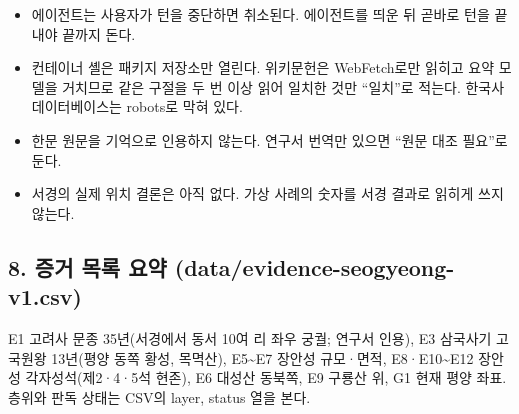 \documentclass[10pt,a4paper]{article}
\providecommand{\tightlist}{\setlength{\itemsep}{0pt}\setlength{\parskip}{0pt}}
\begin{document}
\begin{itemize}
\tightlist
\item
  에이전트는 사용자가 턴을 중단하면 취소된다. 에이전트를 띄운 뒤 곧바로 턴을 끝내야 끝까지 돈다.
\item
  컨테이너 셸은 패키지 저장소만 열린다. 위키문헌은 WebFetch로만 읽히고 요약 모델을 거치므로 같은 구절을 두 번 이상 읽어 일치한 것만 ``일치''로 적는다. 한국사데이터베이스는 robots로 막혀 있다.
\item
  한문 원문을 기억으로 인용하지 않는다. 연구서 번역만 있으면 ``원문 대조 필요''로 둔다.
\item
  서경의 실제 위치 결론은 아직 없다. 가상 사례의 숫자를 서경 결과로 읽히게 쓰지 않는다.
\end{itemize}

\hypertarget{uxc99duxac70-uxbaa9uxb85d-uxc694uxc57d-dataevidence-seogyeong-v1.csv}{%
\subsection{8. 증거 목록 요약 (data/evidence-seogyeong-v1.csv)}\label{uxc99duxac70-uxbaa9uxb85d-uxc694uxc57d-dataevidence-seogyeong-v1.csv}}

E1 고려사 문종 35년(서경에서 동서 10여 리 좌우 궁궐; 연구서 인용), E3 삼국사기 고국원왕 13년(평양 동쪽 황성, 목멱산), E5\textasciitilde E7 장안성 규모·면적, E8·E10\textasciitilde E12 장안성 각자성석(제2·4·5석 현존), E6 대성산 동북쪽, E9 구룡산 위, G1 현재 평양 좌표. 층위와 판독 상태는 CSV의 layer, status 열을 본다.
\end{document}
